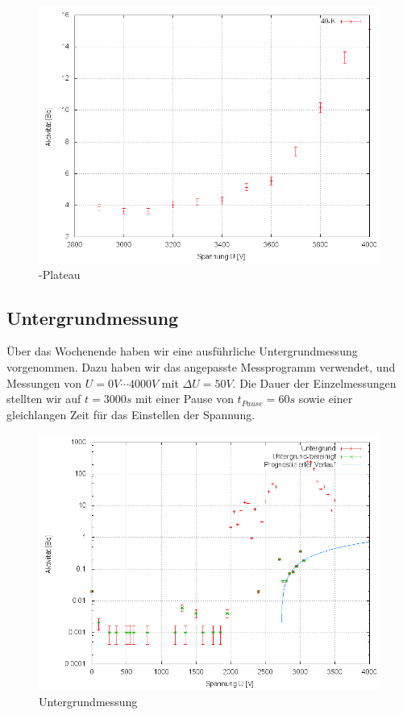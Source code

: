 \begin{figure}[H]
 \centering \includegraphics[width = 0.99\linewidth]{Messwerte/plots/K40_plateau2.png}
 \caption{-Plateau}
\end{figure}

\subsection{Untergrundmessung}
Über das Wochenende haben wir eine ausführliche Untergrundmessung vorgenommen. Dazu haben wir das angepasste Messprogramm verwendet, und Messungen von $U = 0V \cdots 4000V$ mit $\Delta U = 50V$. Die Dauer der Einzelmessungen stellten wir auf $t=3000s$ mit einer Pause von $t_{Pause} = 60 s$ sowie einer gleichlangen Zeit für das Einstellen der Spannung.

\begin{figure}[H]
 \centering \includegraphics[width = 0.99\linewidth]{Messwerte/plots/untergrund_we_bereinigt.png}
 \caption{Untergrundmessung}
\end{figure}


